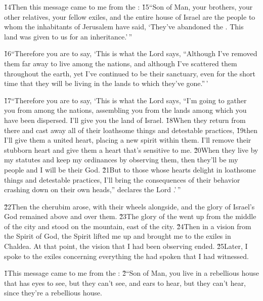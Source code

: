 \v{14}Then this message came to me from the : \v{15}``Son of Man, your brothers, your other relatives, your fellow exiles, and the entire house of Israel are the people to whom the inhabitants of Jerusalem have said, `They've abandoned the . This land was given to us for an inheritance.'\,''

\v{16}``Therefore you are to say, `This is what the Lord  says, ``Although I've removed them far away to live among the nations, and although I've scattered them throughout the earth, yet I've continued to be their sanctuary, even for the short time that they will be living in the lands to which they've gone.''\,'

\v{17}``Therefore you are to say, `This is what the Lord  says, ``I'm going to gather you from among the nations, assembling you from the lands among which you have been dispersed. I'll give you the land of Israel. \v{18}When they return from there and cast away all of their loathsome things and detestable practices, \v{19}then I'll give them a united heart, placing a new spirit within them. I'll remove their stubborn heart and give them a heart that's sensitive to me. \v{20}When they live by my statutes and keep my ordinances by observing them, then they'll be my people and I will be their God. \v{21}But to those whose hearts delight in loathsome things and detestable practices, I'll bring the consequences of their behavior crashing down on their own heads,'' declares the Lord .'\,''

\v{22}Then the cherubim arose, with their wheels alongside, and the glory of Israel's God remained above and over them. \v{23}The glory of the  went up from the middle of the city and stood on the mountain, east of the city. \v{24}Then in a vision from the Spirit of God, the Spirit lifted me up and brought me to the exiles in Chaldea. At that point, the vision that I had been observing ended. \v{25}Later, I spoke to the exiles concerning everything the  had spoken that I had witnessed.

\v{1}This message came to me from the : \v{2}``Son of Man, you live in a rebellious house that has eyes to see, but they can't see, and ears to hear, but they can't hear, since they're a rebellious house.

